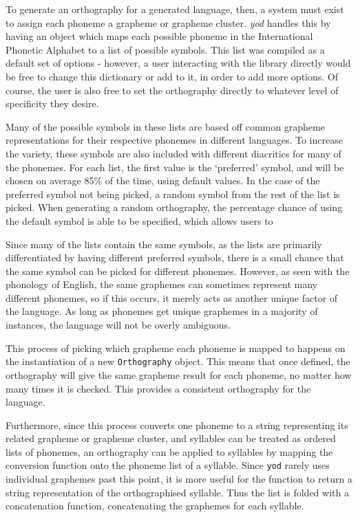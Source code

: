 \documentclass{report}
\begin{document}
	To generate an orthography for a generated language, then, a system must exist to assign each phoneme a grapheme or grapheme cluster. \textit{yod} handles this by having an object which maps each possible phoneme in the International Phonetic Alphabet to a list of possible symbols. This list was compiled as a default set of options - however, a user interacting with the library directly would be free to change this dictionary or add to it, in order to add more options. Of course, the user is also free to set the orthography directly to whatever level of specificity they desire.
	
	Many of the possible symbols in these lists are based off common grapheme representations for their respective phonemes in different languages. To increase the variety, these symbols are also included with different diacritics for many of the phonemes. For each list, the first value is the `preferred' symbol, and will be chosen on average 85\% of the time, using default values. In the case of the preferred symbol not being picked, a random symbol from the rest of the list is picked. When generating a random orthography, the percentage chance of using the default symbol is able to be specified, which allows users to 
	
	Since many of the lists contain the same symbols, as the lists are primarily differentiated by having different preferred symbols, there is a small chance that the same symbol can be picked for different phonemes. However, as seen with the phonology of English, the same graphemes can sometimes represent many different phonemes, so if this occurs, it merely acts as another unique factor of the language. As long as phonemes get unique graphemes in a majority of instances, the language will not be overly ambiguous.
	
	This process of picking which grapheme each phoneme is mapped to happens on the instantiation of a new \texttt{Orthography} object. This means that once defined, the orthography will give the same grapheme result for each phoneme, no matter how many times it is checked. This provides a consistent orthography for the language.
	
	Furthermore, since this process converts one phoneme to a string representing its related grapheme or grapheme cluster, and syllables can be treated as ordered lists of phonemes, an orthography can be applied to syllables by mapping the conversion function onto the phoneme list of a syllable. Since \texttt{yod} rarely uses individual graphemes past this point, it is more useful for the function to return a string representation of the orthographised syllable. Thus the list is folded with a concatenation function, concatenating the graphemes for each syllable.
	
\end{document}

